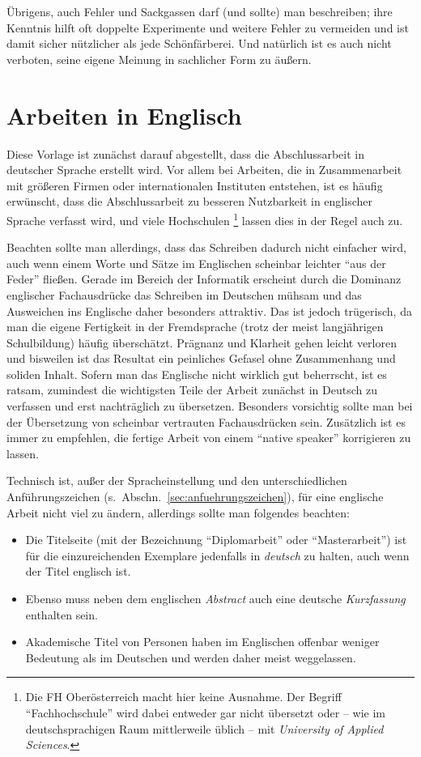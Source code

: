 Übrigens, auch Fehler und Sackgassen darf (und sollte) man
beschreiben; ihre Kenntnis hilft oft doppelte Experimente und
weitere Fehler zu vermeiden und ist damit sicher nützlicher als
jede Schönfärberei.
Und natürlich ist es auch nicht verboten, seine eigene Meinung 
in sachlicher Form zu äußern.


\section{Arbeiten in Englisch}
\label{sec:englisch}

Diese Vorlage ist zunächst darauf abgestellt, dass die
Abschlussarbeit in deutscher Sprache erstellt wird. Vor allem bei
Arbeiten, die in Zusammenarbeit mit größeren Firmen oder
internationalen Instituten entstehen, ist es häufig erwünscht,
dass die Abschlussarbeit zu besseren Nutzbarkeit in englischer
Sprache verfasst wird, und viele Hochschulen%
\footnote{Die FH Oberösterreich macht hier keine Ausnahme. 
Der Begriff "`Fachhochschule"' wird dabei entweder gar nicht
übersetzt oder -- wie im deutschsprachigen Raum mittlerweile üblich -- 
mit \emph{University of Applied Sciences}.
} 
lassen dies in
der Regel auch zu.

Beachten sollte man allerdings, dass das Schreiben dadurch nicht
einfacher wird, auch wenn einem Worte und Sätze im Englischen
scheinbar leichter "`aus der Feder"' fließen. Gerade im Bereich
der Informatik erscheint durch die Dominanz englischer
Fachausdrücke das Schreiben im Deutschen mühsam und das Ausweichen
ins Englische daher besonders attraktiv. Das ist jedoch
trügerisch, da man die eigene Fertigkeit in der Fremdsprache
(trotz der meist langjährigen Schulbildung) häufig überschätzt.
Prägnanz und Klarheit gehen leicht verloren und bisweilen ist das
Resultat ein peinliches Gefasel ohne Zusammenhang und soliden
Inhalt. Sofern man das Englische nicht wirklich gut beherrscht, ist
es ratsam, zumindest die wichtigsten Teile der Arbeit zunächst in
Deutsch zu verfassen und erst nachträglich zu übersetzen.
Besonders vorsichtig sollte man bei der Übersetzung von scheinbar
vertrauten Fachausdrücken sein. Zusätzlich ist es immer zu
empfehlen, die fertige Arbeit von einem "`native speaker"'
korrigieren zu lassen.



Technisch ist, außer der Spracheinstellung und den
unterschiedlichen Anführungszeichen (s.\
Abschn.~\ref{sec:anfuehrungszeichen}), für eine englische Arbeit
nicht viel zu ändern, allerdings sollte man folgendes beachten:
%
\begin{itemize}
\item  Die Titelseite (mit der Bezeichnung "`Diplomarbeit"' oder "`Masterarbeit"') 
ist für die einzureichenden Exemplare jedenfalls in \emph{deutsch} zu halten,
auch wenn der Titel englisch ist. 
\item Ebenso muss neben dem
englischen \emph{Abstract} auch eine deutsche \emph{Kurzfassung}
enthalten sein. %
\item Akademische Titel von Personen haben im Englischen offenbar
weniger Bedeutung als im Deutschen und werden daher meist
weggelassen.
\end{itemize}
